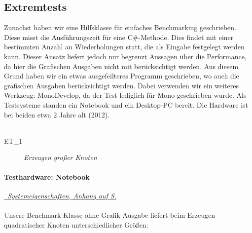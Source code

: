 %



\newpage



\label{Abschnitt:Tests:Protokoll:Extrem}



\subsection*{Extremtests}


Zunächst haben wir eine Hilfsklasse für einfaches Benchmarking geschrieben. Diese misst die Ausführungszeit für eine C\#-Methode. Dies findet mit einer bestimmten Anzahl an Wiederholungen statt, die als Eingabe festgelegt werden kann. Dieser Ansatz liefert jedoch nur begrenzt Aussagen über die Performance, da hier die Grafischen Ausgaben nicht mit berücksichtigt werden. Aus diesem Grund haben wir ein etwas ausgefeilteres Programm geschrieben, wo auch die grafischen Ausgaben berücksichtigt werden. Dabei verwenden wir ein weiteres Werkzeug: MonoDevelop, da der Test lediglich für Mono geschrieben wurde. Als Testsysteme standen ein Notebook und ein Desktop-PC bereit. Die Hardware ist bei beiden etwa 2 Jahre alt (2012).\\~\\


\label{Abschnitt:Tests:Protokoll:Extrem:Knoten_Erzeugen}

\begin{description}

	\item[ET\_1] \textit{Erzeugen großer Knoten}\hfill\\
	
\end{description}


\paragraph*{Testhardware: Notebook}

\label{Abschnitt:Tests:Protokoll:Extrem:Knoten_Erzeugen:Notebook}

\textit{\hyperref[Anhang:Testsysteme:Notebook]{\mousecursor~Systemeigenschaften, Anhang auf S. \pageref{Anhang:Testsysteme:Notebook}}}\\~\\

Unsere Benchmark-Klasse ohne Grafik-Ausgabe liefert beim Erzeugen quadratischer Knoten unterschiedlicher Größen:\\~\\


